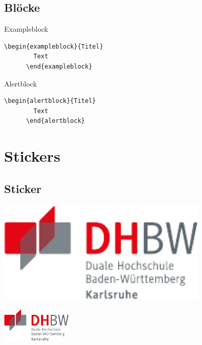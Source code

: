 \subsection{Blöcke}
\begin{frame}[fragile]{\subsecname}

  \begin{exampleblock}{Exampleblock}
    \begin{lstlisting}[gobble=6]
      \begin{exampleblock}{Titel}
        Text
      \end{exampleblock}
    \end{lstlisting}
  \end{exampleblock}

  \begin{alertblock}{Alertblock}
    \begin{lstlisting}[gobble=6]
      \begin{alertblock}{Titel}
        Text
      \end{alertblock}
    \end{lstlisting}
  \end{alertblock}

\end{frame}

\section{Stickers}

\subsection{Sticker}
\begin{frame}{\subsecname}

  \begin{sticker}[+1]
    \includegraphics[width=0.75\textwidth]{DHBW.pdf}
  \end{sticker}

  \begin{sidesticker}[-1]
    \includegraphics[width=0.25\textwidth]{DHBW.pdf}
  \end{sidesticker}

\end{frame}

